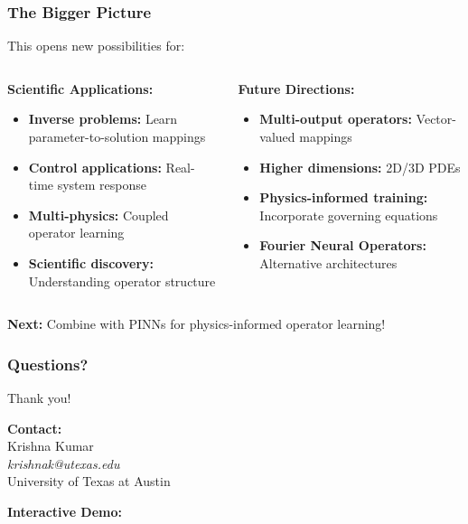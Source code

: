 \documentclass[notes]{beamer}
\begin{document}
\begin{frame}
\frametitle{The Bigger Picture}

This opens new possibilities for:

\begin{columns}[T]
    \begin{column}{0.5\textwidth}
        \textbf{Scientific Applications:}
        \begin{itemize}
            \item \textbf{Inverse problems:} Learn parameter-to-solution mappings
            \item \textbf{Control applications:} Real-time system response
            \item \textbf{Multi-physics:} Coupled operator learning
            \item \textbf{Scientific discovery:} Understanding operator structure
        \end{itemize}
    \end{column}
    \begin{column}{0.5\textwidth}
        \textbf{Future Directions:}
        \begin{itemize}
            \item \textbf{Multi-output operators:} Vector-valued mappings
            \item \textbf{Higher dimensions:} 2D/3D PDEs
            \item \textbf{Physics-informed training:} Incorporate governing equations
            \item \textbf{Fourier Neural Operators:} Alternative architectures
        \end{itemize}
    \end{column}
\end{columns}

\vspace{1cm}

\begin{center}
\textbf{Next:} Combine with PINNs for physics-informed operator learning!
\end{center}

\end{frame}

\begin{frame}
\frametitle{Questions?}

\centering
\Large Thank you!

\vspace{2cm}

\textbf{Contact:} \\
Krishna Kumar \\
\textit{krishnak@utexas.edu} \\
University of Texas at Austin

\vspace{1cm}

\textbf{Interactive Demo:} \\
\href{https://colab.research.google.com/github/kks32-courses/ut-portugal-sciml/blob/main/docs/02-deeponet/deeponet.ipynb}{}

\end{frame}
\end{document}
